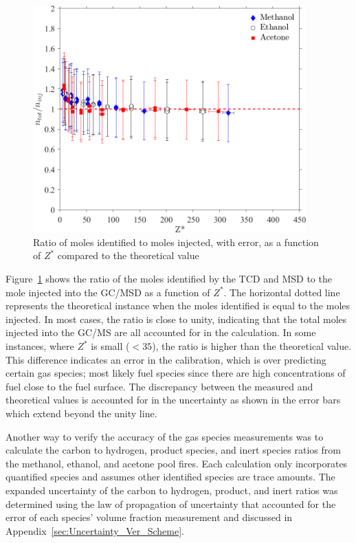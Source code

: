 \documentclass[12pt]{article}
\begin{document}
\begin{figure}[h!]
	\centering
\includegraphics[width=10.5cm,keepaspectratio]{mole_ratio_Comparison.png}
	\caption[Ratio of moles identified to moles injected, with error, as a function of $Z^{*}$]{Ratio of moles identified to moles injected, with error, as a function of $Z^{*}$ compared to the theoretical value}
	\label{fig:Mole_Comp}
\end{figure}

Figure~\ref{fig:Mole_Comp} shows the ratio of the moles identified by the TCD and MSD to the mole injected into the GC/MSD as a function of $Z^{*}$. The horizontal dotted line represents the theoretical instance when the moles identified is equal to the moles injected. In most cases, the ratio is close to unity, indicating that the total moles injected into the GC/MS are all accounted for in the calculation. In some instances, where $Z^{*}$ is small ($<35$), the ratio is higher than the theoretical value. This difference indicates an error in the calibration, which is over predicting certain gas species; most likely fuel species since there are high concentrations of fuel close to the fuel surface. The discrepancy between the measured and theoretical values is accounted for in the uncertainty as shown in the error bars which extend beyond the unity line.

Another way to verify the accuracy of the gas species measurements was to calculate the carbon to hydrogen, product species, and inert species ratios from the methanol, ethanol, and acetone pool fires. Each calculation only incorporates quantified species and assumes other identified species are trace amounts. The expanded uncertainty of the carbon to hydrogen, product, and inert ratios was determined using the law of propagation of uncertainty that accounted for the error of each species' volume fraction measurement and discussed in Appendix~\ref{sec:Uncertainty_Ver_Scheme}.
\end{document}
